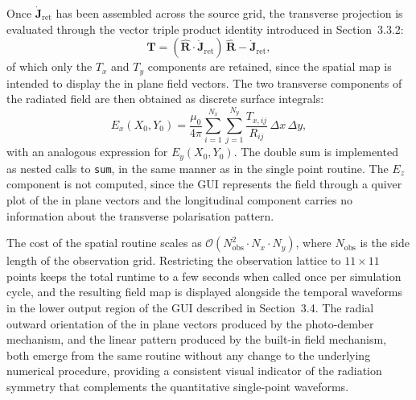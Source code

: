 \documentclass[12pt]{final_project_report}
\begin{document}
Once $\dot{\mathbf{J}}_{\mathrm{ret}}$ has been assembled across the source grid, the transverse projection is evaluated through the vector triple product identity introduced in Section~3.3.2:
\begin{equation}
    \mathbf{T} = (\hat{\mathbf{R}} \cdot \dot{\mathbf{J}}_{\mathrm{ret}})\,\hat{\mathbf{R}} - \dot{\mathbf{J}}_{\mathrm{ret}},
\end{equation}
of which only the $T_x$ and $T_y$ components are retained, since the spatial map is intended to display the in plane field vectors. The two transverse components of the radiated field are then obtained as discrete surface integrals:
\begin{equation}
    E_x(X_0, Y_0) = \frac{\mu_0}{4\pi} \sum_{i=1}^{N_x} \sum_{j=1}^{N_y} \frac{T_{x,ij}}{R_{ij}}\,\Delta x\,\Delta y,
    \label{eq:Ex_spatial}
\end{equation}
with an analogous expression for $E_y(X_0, Y_0)$. The double sum is implemented as nested calls to \texttt{sum}, in the same manner as in the single point routine. The $E_z$ component is not computed, since the GUI represents the field through a quiver plot of the in plane vectors and the longitudinal component carries no information about the transverse polarisation pattern.

The cost of the spatial routine scales as $\mathcal{O}(N_{\mathrm{obs}}^2 \cdot N_x \cdot N_y)$, where $N_{\mathrm{obs}}$ is the side length of the observation grid. Restricting the observation lattice to $11 \times 11$ points keeps the total runtime to a few seconds when called once per simulation cycle, and the resulting field map is displayed alongside the temporal waveforms in the lower output region of the GUI described in Section~3.4. The radial outward orientation of the in plane vectors produced by the photo-dember mechanism, and the linear pattern produced by the built-in field mechanism, both emerge from the same routine without any change to the underlying numerical procedure, providing a consistent visual indicator of the radiation symmetry that complements the quantitative single-point waveforms.
\end{document}
